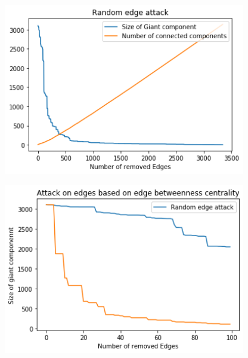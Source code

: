 \documentclass{Resources/netsci-project}
\begin{document}
\begin{center}
    \centering
    \includegraphics[width=300pt]{Resources/edge_random_attacks}
    \label{fig:EdgeRandomAttacks}
\end{center}

\begin{center}
    \centering
    \includegraphics[width=300pt]{Resources/edge_targeted_attacks}
    \label{fig:EdgeTargetedAttacks}
\end{center}
\end{document}
